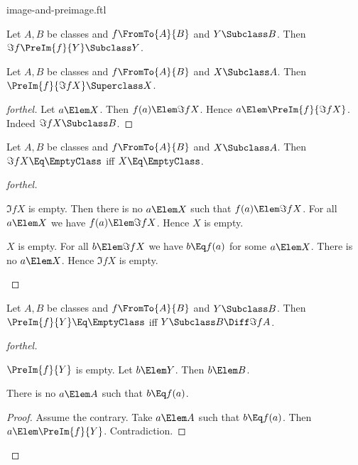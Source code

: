 \documentclass{stex}
\begin{document}
\begin{smodule}{image-and-preimage.ftl}
\begin{proposition*}[forthel]
  Let $A, B$ be classes and $f \FromTo{A}{B}$ and $Y \Subclass B$.
  Then $\Im{f}{\PreIm{f}{Y}} \Subclass Y$.
\end{proposition*}

\begin{proposition*}[forthel]
  Let $A, B$ be classes and $f \FromTo{A}{B}$ and $X \Subclass A$.
  Then $\PreIm{f}{\Im{f}{X}} \Superclass X$.
\end{proposition*}
\begin{proof}[forthel]
  Let $a \Elem X$.
  Then $f(a) \Elem \Im{f}{X}$.
  Hence $a \Elem \PreIm{f}{\Im{f}{X}}$.
  Indeed $\Im{f}{X} \Subclass B$.
\end{proof}

\begin{proposition*}[forthel]
  Let $A, B$ be classes and $f \FromTo{A}{B}$ and $X \Subclass A$.
  Then $\Im{f}{X} \Eq \EmptyClass$ iff $X \Eq \EmptyClass$.
\end{proposition*}
\begin{proof}[forthel]
  \begin{case}{$\Im{f}{X}$ is empty.}
    Then there is no $a \Elem X$ such that $f(a) \Elem \Im{f}{X}$.
    For all $a \Elem X$ we have $f(a) \Elem \Im{f}{X}$.
    Hence $X$ is empty.
  \end{case}

  \begin{case}{$X$ is empty.}
    For all $b \Elem \Im{f}{X}$ we have $b \Eq f(a)$ for some $a \Elem X$.
    There is no $a \Elem X$.
    Hence $\Im{f}{X}$ is empty.
  \end{case}
\end{proof}

\begin{proposition*}[forthel]
  Let $A, B$ be classes and $f \FromTo{A}{B}$ and $Y \Subclass B$.
  Then $\PreIm{f}{Y} \Eq \EmptyClass$ iff $Y \Subclass B \Diff \Im{f}{A}$.
\end{proposition*}
\begin{proof}[forthel]
  \begin{case}{$\PreIm{f}{Y}$ is empty.}
    Let $b \Elem Y$.
    Then $b \Elem B$.

    There is no $a \Elem A$ such that $b \Eq f(a)$.
    \begin{proof}
      Assume the contrary.
      Take $a \Elem A$ such that $b \Eq f(a)$.
      Then $a \Elem \PreIm{f}{Y}$.
      Contradiction.
    \end{proof}


\end{case}
\end{proof}
\end{smodule}
\end{document}

